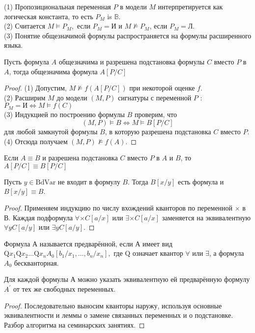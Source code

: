 (1) Пропозициональная переменная $P$ в модели $M$
интерпретируется как логическая константа, то есть $P_{M}$ is $\mathbb{B}$.\\
(2) Считается $M \models P_{M},$ если $P_{M}= \text{И}$ и $M \not \models P_{M}$, если $P_{M}=\text{Л}$.\\
(3) Понятие общезначимой формулы распространяется на формулы расширенного языка.
\vskip 0.2in

\begin{theo} 
Пусть формула $A$ общезначима и разрешена подстановка формулы $C$ вместо $P$ в $A$, тогда общезначима формула $A[P / C]$
\end{theo}
\begin{proof}
(1) Допустим, $M \not \models f(A[P / C])$ при некоторой оценке $f$.\\
(2) Расширим $M$ до модели $(M, P)$ сигнатуры с переменной $P$ :
$P_{M}= \text{И} \Longleftrightarrow M \vDash f(C)$\\
(3) Индукцией по построению формулы $B$ проверим, что
$$
(M, P) \vDash B \Longleftrightarrow M \vDash B[P / C]
$$
для любой замкнутой формулы $B$, в которую разрешена подстановка $C$ вместо $P$.\\
(4) Отсюда получаем $(M, P) \not \models f(A)$.
\end{proof}

\begin{corol}
Если $A \equiv B$ и разрешена подстановка $C$ вместо $P$ в $A$ и $B$, то $A[P / C] \equiv B[P / C]$
\end{corol}

\begin{lem}
Пусть $y \in \mathrm{BdVar}$ не входит в формулу $B$. Тогда $B[x / y]$ есть формула и $B[x / y] \equiv B$.
\end{lem}
\begin{proof}
Применяем индукцию по числу вхождений кванторов по переменной $\times$ в В. Каждая подформула $\forall \times C[a / x]$ или $\exists \times C[a / x]$ заменяется на эквивалентную $\forall y C[a / y]$ или $\exists y C[a / y]$.
\end{proof}

\begin{defn}
Формула А называется предварённой, если А имеет вид $\mathrm{Q} x_{1} \mathrm{Q} x_{2} \ldots \mathrm{Q} x_{n} A_{0}\left[b_{1} / x_{1}, \ldots, b_{n} / x_{n}\right],$ где $\mathrm{Q}$ означает квантор $\forall$ или $\exists$, а формула $A_{0}$ бескванторная.
\end{defn}
\begin{theo}
Для каждой формулы $А$ можно указать эквивалентную ей предварённую формулу $A^{\prime}$ от тех же свободных переменных.
\end{theo}
\begin{proof}
Последовательно выносим кванторы наружу, используя основные эквивалентности и леммы о замене связанных переменных и о подстановке. Разбор алгоритма на семинарских занятиях.
\end{proof}
\vskip 0.8in

